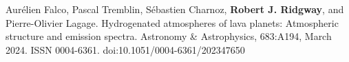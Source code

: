 \documentclass[letter, margin, 10pt]{res} %
\begin{document}
\begin{resume}
Aur\'{e}lien Falco, Pascal Tremblin, S\'{e}bastien Charnoz, \textbf{Robert J. Ridgway}, and Pierre-Olivier Lagage. Hydrogenated atmospheres of lava planets: Atmospheric structure and emission spectra. Astronomy \& Astrophysics, 683:A194, March 2024. ISSN 0004-6361. doi:10.1051/0004-6361/202347650

%
%

\end{resume}
\end{document}
